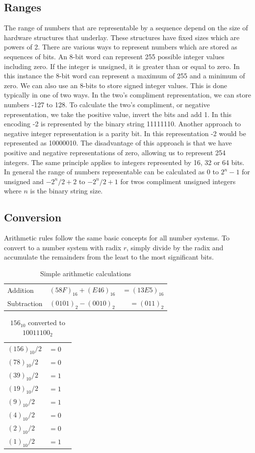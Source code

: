 \documentclass[10pt,a4paper]{article}
\begin{document}
\subsection{Ranges}
The range of numbers that are representable by a sequence depend on the size of hardware structures that underlay. These structures have fixed sizes which are powers of 2. There are various ways to represent numbers which are stored as sequences of bits. An 8-bit word can represent 255 possible integer values including zero. If the integer is unsigned, it is greater than or equal to zero. In this instance the 8-bit word can represent a maximum of 255 and a minimum of zero. We can also use an 8-bits to store signed integer values. This is done typically in one of two ways. In the two's compliment representation, we can store numbers -127 to 128. To calculate the two's compliment, or negative representation, we take the positive value, invert the bits and add 1. In this encoding -2 is represented by the binary string 11111110. Another approach to negative integer representation is a parity bit. In this representation -2 would be represented as 10000010. The disadvantage of this approach is that we have positive and negative representations of zero, allowing us to represent 254 integers.
\newline\newline
The same principle applies to integers represented by 16, 32 or 64 bits. In general the range of numbers representable can be calculated as $0$ to $2^{n} -1$ for unsigned and $-2^{n}/2 + 2$ to $-2^{n}/2 + 1$ for twos compliment unsigned integers where $n$ is the binary string size.    
\subsection{Conversion}
Arithmetic rules follow the same basic concepts for all number systems. To convert to a number system with radix $r$, simply divide by the radix and accumulate the remainders from the least to the most significant bits. 
\begin{table}
\centering
\begin{tabular}{ l c r }
  Addition    & $(58F)_{16} + (E46)_{16}$ & $= (13E5)_{16}$ \\
  Subtraction & $(0101)_2 -(0010)_2$ & $= (011)_2$ \\
\end{tabular}
\caption{Simple arithmetic calculations}
\end{table}
\begin{table}
\centering
\begin{tabular}{ l c r }
  $(156)_{10} / 2$ & $=0$ \\
  $(78)_{10} / 2$ & $=0$  \\
  $(39)_{10} / 2$ & $=1$  \\  
  $(19)_{10} / 2$ & $=1$  \\  
  $(9)_{10} / 2$ & $=1$ \\  
  $(4)_{10} / 2$ & $=0$ \\  
  $(2)_{10} / 2$ & $=0$ \\  
  $(1)_{10} / 2$ & $=1$ \\
\end{tabular}
\caption{$156_{10}$ converted to $10011100_{2}$}
\end{table}
\end{document}
